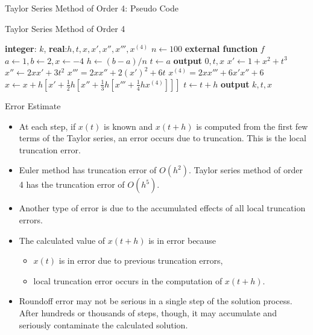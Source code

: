 \documentclass{beamer}
\newcommand{\beforeverb}{\scriptsize}
\newcommand{\afterverb}{\normalsize}
\begin{document}
\begin{frame}{Taylor Series Method of Order 4: Pseudo Code}
\beforeverb
\begin{block}{Taylor Series Method of Order 4}
\begin{algorithmic}
\State \textbf{integer}: $k$, \textbf{real}:$h, t, x, x', x'', x''', x^{(4)}$
\State $n\gets 100$
\State \textbf{external function} $f$
\State $a\gets 1, b  \gets 2, x\gets -4$
\State $h\gets  (b-a)/n$
\State $t\gets a $
\State \textbf{output} $0,t,x$
\State $x' \gets 1+x^2+t^3$
\State $x'' \gets 2xx'+3t^2$
\State $x'''=2xx''+2(x')^2+6t$
\State $x^{(4)}= 2xx'''+6x'x''+6$
\State $x\gets x+h\left[x'+\frac{1}{2}h\left[x''+\frac{1}{3}h\left[x'''+\frac{1}{4}hx^{(4)}\right]\right]\right]$
\State $t\gets t+h$
\State \textbf{output} $k,t,x$
\EndFor
\end{algorithmic}
\end{block}
\afterverb

\end{frame}
\begin{frame}{Error Estimate}
\begin{itemize}

\item At each step, if $x(t)$ is known and $x(t +h)$ is computed from the first few terms of the Taylor series, an error occurs due to truncation. This is the \alert{local truncation error}.
 \item Euler method has truncation error of $O(h^2)$. Taylor series method of order 4 has  the truncation error of $O(h^5)$.
\item Another type of error is due to the \alert{accumulated effects} of all local truncation errors. 
\item The calculated value of $x(t + h)$ is in error because 
\begin{itemize} 
\item $x(t)$ is in error due to \alert{previous truncation errors},
\item \alert{local truncation error} occurs in the computation of $x(t + h)$.
\end{itemize} 

\item Roundoff error may not be serious in \alert{a single step} of the solution process. After hundreds or thousands of steps, though, it may accumulate and seriously contaminate the calculated solution.
 
\end{itemize}
\end{frame}
\end{document}
